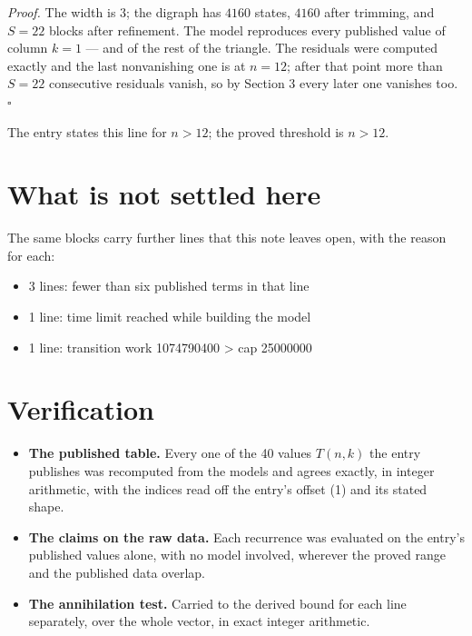 \documentclass[11pt]{article}
\theoremstyle{definition}
\begin{document}
{\itshape Proof.} The width is $3$; the digraph has $4160$ states, $4160$ after trimming, and $S = 22$ blocks after refinement. The model reproduces every published value of column $k = 1$ --- and of the rest of the triangle. The residuals were computed exactly and the last nonvanishing one is at $n = 12$; after that point more than $S = 22$ consecutive residuals vanish, so by Section 3 every later one vanishes too. $\square$

The entry states this line for $n > 12$; the proved threshold is $n > 12$.

\section{What is not settled here}

The same blocks carry further lines that this note leaves open, with the reason for each:

\begin{itemize}

\item 3 lines: fewer than six published terms in that line

\item 1 line: time limit reached while building the model

\item 1 line: transition work 1074790400 > cap 25000000

\end{itemize}

\section{Verification}

\begin{itemize}

\item {\bfseries The published table.} Every one of the 40 values $T(n,k)$ the entry publishes was recomputed from the models and agrees exactly, in integer arithmetic, with the indices read off the entry's offset (1) and its stated shape.

\item {\bfseries The claims on the raw data.} Each recurrence was evaluated on the entry's published values alone, with no model involved, wherever the proved range and the published data overlap.

\item {\bfseries The annihilation test.} Carried to the derived bound for each line separately, over the whole vector, in exact integer arithmetic.

\end{itemize}
\end{document}

